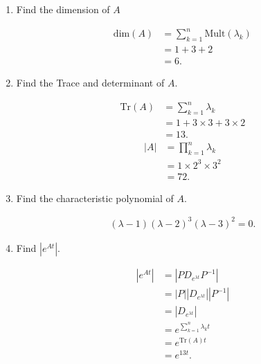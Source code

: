 \documentclass{zc-ust-hw}
\begin{document}
\begin{enumerate}
\begin{enumerate}
       \begin{enumerate}
         \item Find the dimension of \( A \) 
           \begin{sol}
            \begin{align}
              \text{dim}(A) &= \sum_{k=1}^{n} \text{Mult}(\lambda_{k}) \\
              &= 1+3+2 \\
              &= 6
            .\end{align}
           \end{sol}
         \item Find the Trace and determinant of \( A \). 
           \begin{sol}
            \begin{align}
              \text{Tr}(A) &= \sum_{k=1}^{n} \lambda_{k} \\
              &= 1+3\times 3 + 3 \times 2 \\
              &= 13
            .\end{align}
            \begin{align}
              |A| &= \prod_{k=1}^{n} \lambda_{k} \\
              &= 1 \times  2^3 \times  3^2 \\
              &= 72
            .\end{align}
           \end{sol}
         \item Find the characteristic polynomial of \( A \). 
           \begin{sol}
            \begin{align}
              (\lambda-1)(\lambda-2)^3(\lambda-3)^2=0
            .\end{align}
           \end{sol}
         \item Find \(|e^{At}|\). 
           \begin{sol}
            \begin{align}
              |e^{At}| &= |PD_{e^{\lambda t}}P^{-1}| \\
              &= |P| |D_{e^{\lambda t}}| |P^{-1}|  \\
              &= |D_{e^{\lambda t}}| \\
              &= e^{\sum_{k=1}^{n} \lambda_{k}t} \\
              &= e^{\text{Tr}(A)t} \\
              &= e^{13t} 
            .\end{align}
           \end{sol}
       \end{enumerate}


\end{enumerate}
\end{enumerate}
\end{document}
